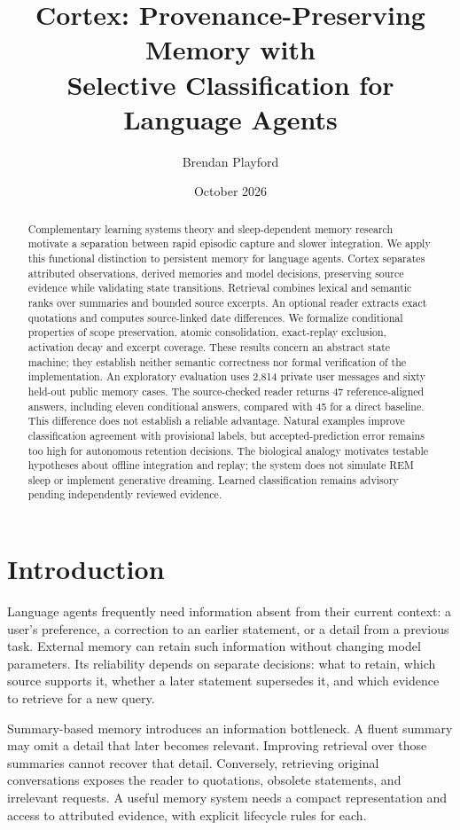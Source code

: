 \documentclass[11pt]{article}
\title{Cortex: Provenance-Preserving Memory with\\Selective Classification for Language Agents}
\author{Brendan Playford}
\date{October 2026}
\begin{document}
\maketitle
\begin{abstract}
Complementary learning systems theory and sleep-dependent memory research motivate a separation between rapid episodic capture and slower integration. We apply this functional distinction to persistent memory for language agents. Cortex separates attributed observations, derived memories and model decisions, preserving source evidence while validating state transitions. Retrieval combines lexical and semantic ranks over summaries and bounded source excerpts. An optional reader extracts exact quotations and computes source-linked date differences. We formalize conditional properties of scope preservation, atomic consolidation, exact-replay exclusion, activation decay and excerpt coverage. These results concern an abstract state machine; they establish neither semantic correctness nor formal verification of the implementation. An exploratory evaluation uses 2,814 private user messages and sixty held-out public memory cases. The source-checked reader returns 47 reference-aligned answers, including eleven conditional answers, compared with 45 for a direct baseline. This difference does not establish a reliable advantage. Natural examples improve classification agreement with provisional labels, but accepted-prediction error remains too high for autonomous retention decisions. The biological analogy motivates testable hypotheses about offline integration and replay; the system does not simulate REM sleep or implement generative dreaming. Learned classification remains advisory pending independently reviewed evidence.
\end{abstract}

\section{Introduction}
Language agents frequently need information absent from their current context: a user's preference, a correction to an earlier statement, or a detail from a previous task. External memory can retain such information without changing model parameters. Its reliability depends on separate decisions: what to retain, which source supports it, whether a later statement supersedes it, and which evidence to retrieve for a new query.

Summary-based memory introduces an information bottleneck. A fluent summary may omit a detail that later becomes relevant. Improving retrieval over those summaries cannot recover that detail. Conversely, retrieving original conversations exposes the reader to quotations, obsolete statements, and irrelevant requests. A useful memory system needs a compact representation and access to attributed evidence, with explicit lifecycle rules for each.
\end{document}
